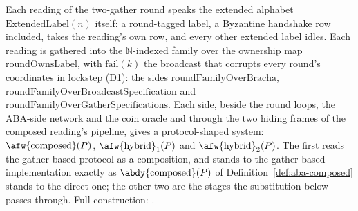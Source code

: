 \begin{definition}
  \label{def:aba-afw-sides}
  \leanok
  Each reading of the two-gather round speaks the extended alphabet $\mathrm{ExtendedLabel}(n)$ itself: a round-tagged label, a Byzantine handshake row included, takes the reading's own row, and every other extended label idles.
  Each reading is gathered into the $\mathbb{N}$-indexed family over the ownership map $\mathrm{roundOwnsLabel}$, with $\mathrm{fail}(k)$ the broadcast that corrupts every round's coordinates in lockstep (D1): the sides $\mathrm{roundFamilyOverBracha}$, $\mathrm{roundFamilyOverBroadcastSpecification}$ and $\mathrm{roundFamilyOverGatherSpecifications}$.
  Each side, beside the round loops, the ABA-side network and the coin oracle and through the two hiding frames of the composed reading's pipeline, gives a protocol-shaped system: $\afw{\mathrm{composed}}(P)$, $\afw{\mathrm{hybrid}}_1(P)$ and $\afw{\mathrm{hybrid}}_2(P)$. The first reads the gather-based protocol as a composition, and stands to the gather-based implementation exactly as $\abdy{\mathrm{composed}}(P)$ of Definition~\ref{def:aba-composed} stands to the direct one; the other two are the stages the substitution below passes through.
  Full construction: .
\end{definition}
